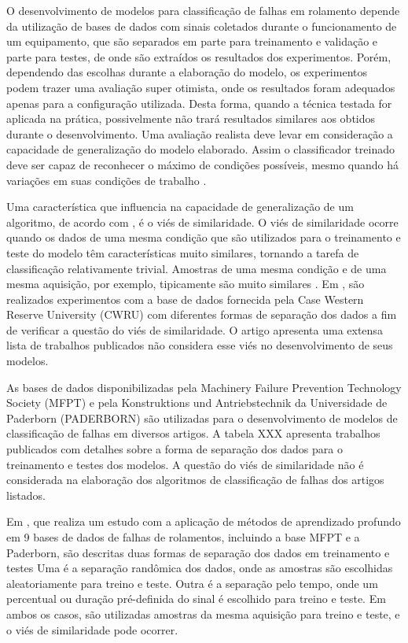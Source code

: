 \documentclass[letterpaper]{article}
\begin{document}
O desenvolvimento de modelos para classificação de falhas em rolamento depende da utilização de bases de dados com sinais coletados durante o funcionamento de um equipamento, que são separados em parte para treinamento e validação e parte para testes, de onde são extraídos os resultados dos experimentos. Porém, dependendo das escolhas durante a elaboração do modelo, os experimentos podem trazer uma avaliação super otimista, onde os resultados foram adequados apenas para a configuração utilizada. Desta forma, quando a técnica testada for aplicada na prática, possivelmente não trará resultados similares aos obtidos durante o desenvolvimento. Uma avaliação realista deve levar em consideração a capacidade de generalização do modelo elaborado. Assim o classificador treinado deve ser capaz de reconhecer o máximo de condições possíveis, mesmo quando há variações em suas condições de trabalho \cite{rauber2020experimental}.

Uma característica que influencia na capacidade de generalização de um algoritmo, de acordo com \cite{rauber2020experimental}, é o viés de similaridade. O viés de similaridade ocorre quando os dados de uma mesma condição que são utilizados para o treinamento e teste do modelo têm características muito similares, tornando a tarefa de classificação relativamente trivial. Amostras de uma mesma condição e de uma mesma aquisição, por exemplo, tipicamente são muito similares \cite{rauber2020experimental}. Em \cite{rauber2020experimental}, são realizados experimentos com a base de dados fornecida pela Case Western Reserve University (CWRU) com diferentes formas de separação dos dados a fim de verificar a questão do viés de similaridade. O artigo apresenta uma extensa lista de trabalhos publicados não considera esse viés no desenvolvimento de seus modelos.

As bases de dados disponibilizadas pela Machinery Failure Prevention Technology Society (MFPT) e pela Konstruktions und Antriebstechnik da Universidade de Paderborn (PADERBORN) são utilizadas para o desenvolvimento de modelos de classificação de falhas em diversos artigos. A tabela XXX apresenta trabalhos publicados com detalhes sobre a forma de separação dos dados para o treinamento e testes dos modelos. A questão do viés de similaridade não é considerada na elaboração dos algoritmos de classificação de falhas dos artigos listados.

Em \cite{zhao2020deep}, que realiza um estudo com a aplicação de métodos de aprendizado profundo em 9 bases de dados de falhas de rolamentos, incluindo a base MFPT e a Paderborn, são descritas duas formas de separação dos dados em treinamento e testes Uma é a separação randômica dos dados, onde as amostras são escolhidas aleatoriamente para treino e teste. Outra é a separação pelo tempo, onde um percentual ou duração pré-definida do sinal é escolhido para treino e teste. Em ambos os casos, são utilizadas amostras da mesma aquisição para treino e teste, e o viés de similaridade pode ocorrer.
\end{document}
